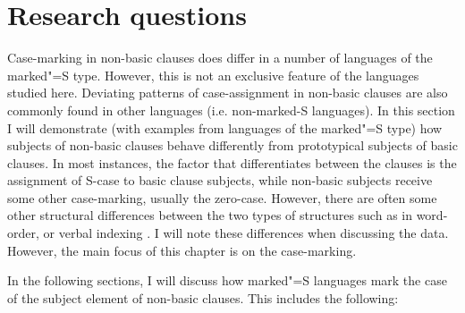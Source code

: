 


\section{Research questions}\label{QueNonBasic}

Case-marking in non-basic clauses does differ in a number of languages of the marked"=S type.
However, this is not an exclusive feature of the languages studied here.
Deviating patterns of case-assignment in non-basic clauses are also commonly found in other languages (i.e. non-marked-S languages).
In this section I will demonstrate (with examples from languages of the marked"=S type) how subjects of non-basic clauses behave differently from prototypical subjects of basic clauses. 
In most instances, the factor that differentiates between the clauses is the assignment of S-case to basic clause subjects, while non-basic subjects receive some other case-marking, usually the zero-case. 
However, there are often some other structural differences between the two types of structures such as in word-order, or verbal indexing . 
I will note these differences when discussing the data. 
However, the main focus of this chapter is on the case-marking. 

In the following sections, I will discuss how marked"=S languages mark the case of the subject element of non-basic clauses. 
This includes the following: 

